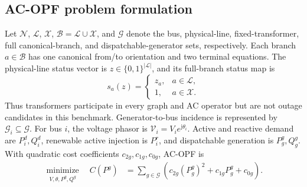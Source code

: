 \documentclass[final,5p,times,twocolumn]{elsarticle}
\newcommand{\Nset}{\mathcal{N}}
\newcommand{\Lset}{\mathcal{L}}
\newcommand{\Bset}{\mathcal{B}}
\newcommand{\Xset}{\mathcal{X}}
\newcommand{\Gset}{\mathcal{G}}
\begin{document}
\subsection{AC-OPF problem formulation}
\label{subsec:acopf}

Let $\Nset$, $\Lset$, $\Xset$, $\Bset=\Lset\cup\Xset$, and $\Gset$ denote the
bus, physical-line, fixed-transformer, full canonical-branch, and
dispatchable-generator sets, respectively. Each branch $a\in\Bset$ has one
canonical from/to orientation and two terminal equations. The physical-line
status vector is $z\in\{0,1\}^{|\Lset|}$, and its full-branch status map is
\begin{equation}
  s_a(z)=
  \begin{cases}
    z_a, & a\in\Lset,\\
    1, & a\in\Xset.
  \end{cases}
  \label{eq:full_branch_status}
\end{equation}
Thus transformers participate in every graph and AC operator but are not
outage candidates in this benchmark.
Generator-to-bus incidence is represented by
$\Gset_i\subseteq\Gset$. For bus $i$, the voltage phasor is
$\mathcal{V}_i=V_i e^{\mathrm{j}\theta_i}$. Active and reactive demand are
$P_i^d,Q_i^d$, renewable active injection is $P_i^r$, and dispatchable
generation is $P_g^g,Q_g^g$. With quadratic cost coefficients
$c_{2g},c_{1g},c_{0g}$, AC-OPF is
\begin{align}
  \underset{\substack{V,\theta,P^g,Q^g}}{\operatorname{minimize}}
  \quad
  C(P^g)
  &=
  \sum_{g\in\Gset}
  \left(c_{2g}(P_g^g)^2+c_{1g}P_g^g+c_{0g}\right).
  \label{eq:objective}
\end{align}
\end{document}
